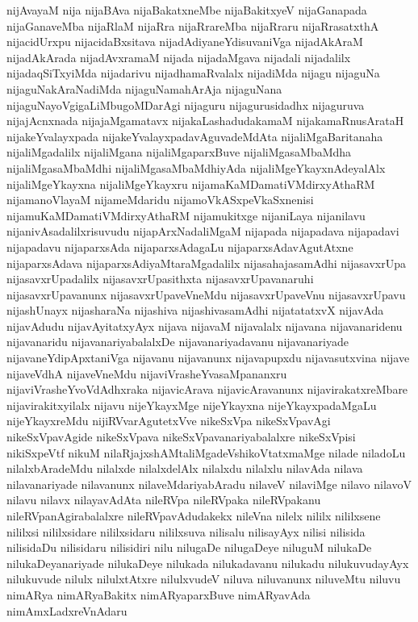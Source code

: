 {nijAvayaM
nija
nijaBAva
nijaBakatxneMbe
nijaBakitxyeV
nijaGanapada
nijaGanaveMba
nijaRlaM
nijaRra
nijaRrareMba
nijaRraru
nijaRrasatxthA
nijacidUrxpu
nijacidaBxsitava
nijadAdiyaneYdisuvaniVga
nijadAkAraM
nijadAkArada
nijadAvxramaM
nijada
nijadaMgava
nijadali
nijadalilx
nijadaqSiTxyiMda
nijadarivu
nijadhamaRvalalx
nijadiMda
nijagu
nijaguNa
nijaguNakAraNadiMda
nijaguNamahArAja
nijaguNana
nijaguNayoVgigaLiMbugoMDarAgi
nijaguru
nijagurusidadhx
nijaguruva
nijajAcnxnada
nijajaMgamatavx
nijakaLashadudakamaM
nijakamaRnusArataH
nijakeYvalayxpada
nijakeYvalayxpadavAguvadeMdAta
nijaliMgaBaritanaha
nijaliMgadalilx
nijaliMgana
nijaliMgaparxBuve
nijaliMgasaMbaMdha
nijaliMgasaMbaMdhi
nijaliMgasaMbaMdhiyAda
nijaliMgeYkayxnAdeyalAlx
nijaliMgeYkayxna
nijaliMgeYkayxru
nijamaKaMDamatiVMdirxyAthaRM
nijamanoVlayaM
nijameMdaridu
nijamoVkASxpeVkaSxnenisi
nijamuKaMDamatiVMdirxyAthaRM
nijamukitxge
nijaniLaya
nijanilavu
nijanivAsadalilxrisuvudu
nijapArxNadaliMgaM
nijapada
nijapadava
nijapadavi
nijapadavu
nijaparxsAda
nijaparxsAdagaLu
nijaparxsAdavAgutAtxne
nijaparxsAdava
nijaparxsAdiyaMtaraMgadalilx
nijasahajasamAdhi
nijasavxrUpa
nijasavxrUpadalilx
nijasavxrUpasithxta
nijasavxrUpavanaruhi
nijasavxrUpavanunx
nijasavxrUpaveVneMdu
nijasavxrUpaveVnu
nijasavxrUpavu
nijashUnayx
nijasharaNa
nijashiva
nijashivasamAdhi
nijatatatxvX
nijavAda
nijavAdudu
nijavAyitatxyAyx
nijava
nijavaM
nijavalalx
nijavana
nijavanaridenu
nijavanaridu
nijavanariyabalalxDe
nijavanariyadavanu
nijavanariyade
nijavaneYdipApxtaniVga
nijavanu
nijavanunx
nijavapupxdu
nijavasutxvina
nijave
nijaveVdhA
nijaveVneMdu
nijaviVrasheYvasaMpananxru
nijaviVrasheYvoVdAdhxraka
nijavicArava
nijavicAravanunx
nijavirakatxreMbare
nijavirakitxyilalx
nijavu
nijeYkayxMge
nijeYkayxna
nijeYkayxpadaMgaLu
nijeYkayxreMdu
nijiRVvarAgutetxVve
nikeSxVpa
nikeSxVpavAgi
nikeSxVpavAgide
nikeSxVpava
nikeSxVpavanariyabalalxre
nikeSxVpisi
nikiSxpeVtf
nikuM
nilaRjajxshAMtaliMgadeVshikoVtatxmaMge
nilade
niladoLu
nilalxbAradeMdu
nilalxde
nilalxdelAlx
nilalxdu
nilalxlu
nilavAda
nilava
nilavanariyade
nilavanunx
nilaveMdariyabAradu
nilaveV
nilaviMge
nilavo
nilavoV
nilavu
nilavx
nilayavAdAta
nileRVpa
nileRVpaka
nileRVpakanu
nileRVpanAgirabalalxre
nileRVpavAdudakekx
nileVna
nilelx
nililx
nililxsene
nililxsi
nililxsidare
nililxsidaru
nililxsuva
nilisalu
nilisayAyx
nilisi
nilisida
nilisidaDu
nilisidaru
nilisidiri
nilu
nilugaDe
nilugaDeye
niluguM
nilukaDe
nilukaDeyanariyade
nilukaDeye
nilukada
nilukadavanu
nilukadu
nilukuvudayAyx
nilukuvude
nilulx
nilulxtAtxre
nilulxvudeV
niluva
niluvanunx
niluveMtu
niluvu
nimARya
nimARyaBakitx
nimARyaparxBuve
nimARyavAda
nimAmxLadxreVnAdaru
}
